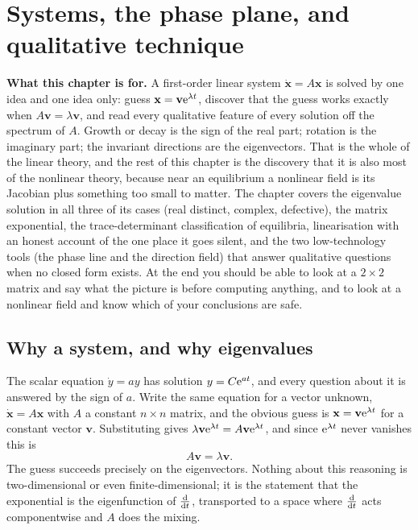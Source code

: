 \chapter{Systems, the phase plane, and qualitative technique}

\begin{orient}
\textbf{What this chapter is for.} A first-order linear system $\dot{\mathbf{x}}=A\mathbf{x}$ is solved by one idea and one idea only: guess $\mathbf{x}=\mathbf{v}\mathrm{e}^{\lambda t}$, discover that the guess works exactly when $A\mathbf{v}=\lambda\mathbf{v}$, and read every qualitative feature of every solution off the spectrum of $A$. Growth or decay is the sign of the real part; rotation is the imaginary part; the invariant directions are the eigenvectors. That is the whole of the linear theory, and the rest of this chapter is the discovery that it is also most of the nonlinear theory, because near an equilibrium a nonlinear field is its Jacobian plus something too small to matter. The chapter covers the eigenvalue solution in all three of its cases (real distinct, complex, defective), the matrix exponential, the trace-determinant classification of equilibria, linearisation with an honest account of the one place it goes silent, and the two low-technology tools (the phase line and the direction field) that answer qualitative questions when no closed form exists. At the end you should be able to look at a $2\times2$ matrix and say what the picture is before computing anything, and to look at a nonlinear field and know which of your conclusions are safe.
\end{orient}

\section{Why a system, and why eigenvalues}

The scalar equation $\dot y=ay$ has solution $y=C\mathrm{e}^{at}$, and every question about it is answered by the sign of $a$. Write the same equation for a vector unknown, $\dot{\mathbf{x}}=A\mathbf{x}$ with $A$ a constant $n\times n$ matrix, and the obvious guess is $\mathbf{x}=\mathbf{v}\mathrm{e}^{\lambda t}$ for a constant vector $\mathbf{v}$. Substituting gives $\lambda\mathbf{v}\mathrm{e}^{\lambda t}=A\mathbf{v}\mathrm{e}^{\lambda t}$, and since $\mathrm{e}^{\lambda t}$ never vanishes this is
\[A\mathbf{v}=\lambda\mathbf{v}.\]
The guess succeeds precisely on the eigenvectors. Nothing about this reasoning is two-dimensional or even finite-dimensional; it is the statement that the exponential is the eigenfunction of $\frac{\mathrm{d}}{\mathrm{d}t}$, transported to a space where $\frac{\mathrm{d}}{\mathrm{d}t}$ acts componentwise and $A$ does the mixing.

